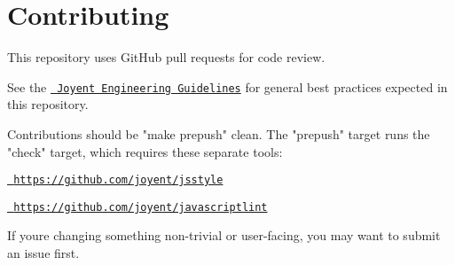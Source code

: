 \chapter{Contributing}
\hypertarget{md__2_users_2hello_2_documents_2_git_hub_2finalproject-engine-drop-table-engines_2_engine_2src_2889cc876a4f1e4780f49c6cfd6d5875f}{}\label{md__2_users_2hello_2_documents_2_git_hub_2finalproject-engine-drop-table-engines_2_engine_2src_2889cc876a4f1e4780f49c6cfd6d5875f}
\label{md__2_users_2hello_2_documents_2_git_hub_2finalproject-engine-drop-table-engines_2_engine_2src_2889cc876a4f1e4780f49c6cfd6d5875f_autotoc_md10457}%
%


This repository uses Git\+Hub pull requests for code review.

See the \href{https://github.com/joyent/eng/blob/master/docs/index.md}{\texttt{ Joyent Engineering Guidelines}} for general best practices expected in this repository.

Contributions should be "{}make prepush"{} clean. The "{}prepush"{} target runs the "{}check"{} target, which requires these separate tools\+:


\begin{DoxyItemize}
\item \href{https://github.com/joyent/jsstyle}{\texttt{ https\+://github.\+com/joyent/jsstyle}}
\item \href{https://github.com/joyent/javascriptlint}{\texttt{ https\+://github.\+com/joyent/javascriptlint}}
\end{DoxyItemize}

If you\textquotesingle{}re changing something non-\/trivial or user-\/facing, you may want to submit an issue first. 